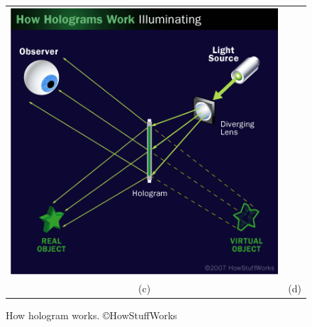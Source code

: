 \begin{figure}
\begin{tabular}{cc}
\includegraphics[width=0.45\linewidth,keepaspectratio=true]{figs/hologram04.png}\\ 
(c)&(d)\\
\end{tabular}
\caption{How hologram works. ©HowStuffWorks}
\label{fig.hologram}
\end{figure}